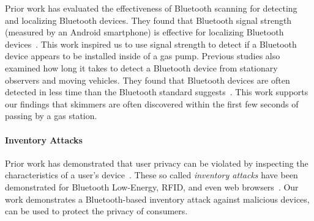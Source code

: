 Prior work has evaluated the effectiveness of Bluetooth scanning for detecting
and localizing Bluetooth devices.
%
They found that Bluetooth signal strength (measured by an Android smartphone)
is effective for localizing Bluetooth
devices~\cite{liu2014face,wang2013bluetooth}.
%
This work inspired us to use signal strength to detect if a Bluetooth device
appears to be installed inside of a gas pump.
%
Previous studies also examined how long it takes to detect a Bluetooth
device from stationary observers and moving vehicles.
%
They found that Bluetooth devices are often detected in less time than the
Bluetooth standard suggests~\cite{murphy2002using,
peterson2006bluetooth,haartsen1998bluetooth}.
%
This work supports our findings that skimmers are often discovered within the
first few seconds of passing by a gas station.
%

\paragraph{Inventory Attacks}

Prior work has demonstrated that user privacy can be violated by inspecting the
characteristics of a user's device~\cite{ziegeldorf2014privacy}.
%
These so called \emph{inventory attacks} have been demonstrated for Bluetooth
Low-Energy, RFID, and even web browsers~\cite{van201050,
vastel18fp,fawaz2016protecting}.
%
Our work demonstrates a Bluetooth-based inventory attack against malicious
devices, can be used to protect the privacy of consumers.

